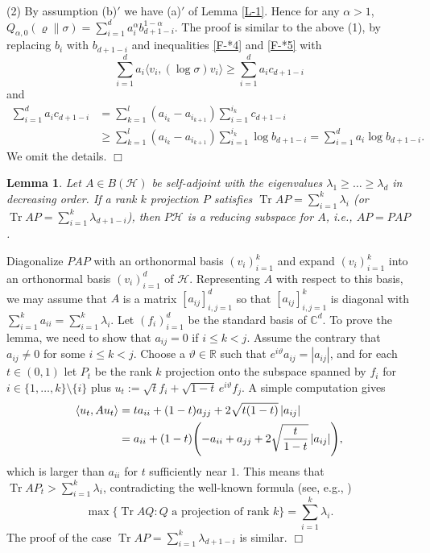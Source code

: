 \documentclass[unsortedaddress,superscriptaddress,pra,notitlepage]{revtex4}
\newtheorem{lemma}[definition]{Lemma}
\newenvironment{proof}[1][Proof]{\begin{trivlist}
\item[\hskip \labelsep {\bfseries #1}]}{\hfill$\Box$\end{trivlist}}
\def\bC{\mathbb{C}}
\def\bR{\mathbb{R}}
\def\theta{\vartheta}
\def\rho{\varrho}
\def\cH{\mathcal{H}}
\def\<{\langle}
\def\>{\rangle}
\def\<{\langle}
\def\>{\rangle}
\DeclareMathOperator{\Tr}{Tr}
\begin{document}
\begin{proof}
(2)\enspace
By assumption (b)$'$ we have (a)$'$ of Lemma \ref{L-1}. Hence for any $\alpha>1$,
$Q_{\alpha,0}(\rho\|\sigma)=\sum_{i=1}^da_i^\alpha b_{d+1-i}^{1-\alpha}$. The proof is
similar to the above (1), by replacing $b_i$ with $b_{d+1-i}$ and inequalities \eqref{F-*4}
and \eqref{F-*5} with
\[
\sum_{i=1}^da_i\<v_i,(\log\sigma)v_i\>\ge\sum_{i=1}^da_ic_{d+1-i}
\]
and
\begin{align*}
\sum_{i=1}^da_ic_{d+1-i}
&=\sum_{k=1}^l(a_{i_k}-a_{i_{k+1}})\sum_{i=1}^{i_k}c_{d+1-i} \\
&\ge\sum_{k=1}^l(a_{i_k}-a_{i_{k+1}})\sum_{i=1}^{i_k}\log b_{d+1-i}
=\sum_{i=1}^da_i\log b_{d+1-i}.
\end{align*}
We omit the details.
\end{proof}

\begin{lemma}\label{L-3}
Let $A\in B(\cH)$ be self-adjoint with the eigenvalues $\lambda_1\ge\ldots\ge\lambda_d$
in decreasing order. If a rank $k$ projection $P$ satisfies $\Tr AP=\sum_{i=1}^k\lambda_i$
(or $\Tr AP=\sum_{i=1}^k\lambda_{d+1-i}$), then $P\cH$ is a reducing subspace for $A$, 
i.e., $AP=PAP$.
\end{lemma}

\begin{proof}
Diagonalize $PAP$ with an orthonormal basis $(v_i)_{i=1}^k$ and expand $(v_i)_{i=1}^k$
into an orthonormal basis $(v_i)_{i=1}^d$ of $\cH$. Representing $A$ with respect to this
basis, we may assume that $A$ is a matrix $[a_{ij}]_{i,j=1}^d$ so that $[a_{ij}]_{i,j=1}^k$ is
diagonal with $\sum_{i=1}^ka_{ii}=\sum_{i=1}^k\lambda_i$. Let $(f_i)_{i=1}^d$ be the
standard basis of $\bC^d$. To prove the lemma, we need to show that $a_{ij}=0$ if $i\le k<j$.
Assume the contrary that $a_{ij}\ne0$ for some $i\le k<j$. Choose a $\theta\in\bR$ such that
$e^{i\theta}a_{ij}=|a_{ij}|$, and for each $t\in(0,1)$ let $P_t$ be the rank $k$ projection onto
the subspace spanned by $f_i$ for $i\in\{1,\ldots,k\}\setminus\{i\}$ plus
$u_t:=\sqrt tf_i+\sqrt{1-t}\,e^{i\theta}f_j$. A simple computation gives
\begin{align*}
\<u_t,Au_t\>&=ta_{ii}+(1-t)a_{jj}+2\sqrt{t(1-t)}\,|a_{ij}| \\
&=a_{ii}+(1-t)\Biggl(-a_{ii}+a_{jj}+2\sqrt{t\over1-t}\,|a_{ij}|\Biggr),
\end{align*}
which is larger than $a_{ii}$ for $t$ sufficiently near $1$. This means that
$\Tr AP_t>\sum_{i=1}^k\lambda_i$, contradicting the well-known formula (see, e.g.,
\cite[Exercise II.1.13]{Bhatia})
\[
\max\{\Tr AQ:\mbox{$Q$ a projection of rank $k$}\}=\sum_{i=1}^k\lambda_i.
\]
The proof of the case $\Tr AP=\sum_{i=1}^k\lambda_{d+1-i}$ is similar.
\end{proof}
\end{document}
